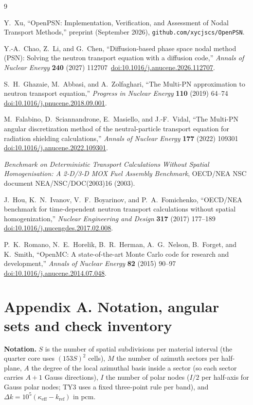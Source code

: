 \documentclass[11pt,a4paper]{article}
\newcommand{\keff}{\kappa_{\mathrm{eff}}}
\newcommand{\doi}[1]{\,\href{https://doi.org/#1}{doi:#1}}
\begin{document}
\begin{thebibliography}{9}
\small

Y.~Xu, ``OpenPSN: Implementation, Verification, and Assessment of Nodal Transport
Methods,'' preprint (September 2026), \texttt{github.com/xycjscs/OpenPSN}.

Y.-A.~Chao, Z.~Li, and G.~Chen, ``Diffusion-based phase space nodal method (PSN):
Solving the neutron transport equation with a diffusion code,'' \emph{Annals of
Nuclear Energy} \textbf{240} (2027) 112707 \doi{10.1016/j.anucene.2026.112707}.

S.~H.~Ghazaie, M.~Abbasi, and A.~Zolfaghari, ``The Multi-PN approximation to neutron
transport equation,'' \emph{Progress in Nuclear Energy} \textbf{110} (2019) 64--74
\doi{10.1016/j.pnucene.2018.09.001}.

M.~Falabino, D.~Sciannandrone, E.~Masiello, and J.-F.~Vidal, ``The Multi-PN angular
discretization method of the neutral-particle transport equation for radiation
shielding calculations,'' \emph{Annals of Nuclear Energy} \textbf{177} (2022) 109301
\doi{10.1016/j.anucene.2022.109301}.

\emph{Benchmark on Deterministic Transport Calculations Without Spatial
Homogenisation: A 2-D/3-D MOX Fuel Assembly Benchmark}, OECD/NEA NSC document
NEA/NSC/DOC(2003)16 (2003).

J.~Hou, K.~N.~Ivanov, V.~F.~Boyarinov, and P.~A.~Fomichenko, ``OECD/NEA benchmark for
time-dependent neutron transport calculations without spatial homogenization,''
\emph{Nuclear Engineering and Design} \textbf{317} (2017) 177--189
\doi{10.1016/j.nucengdes.2017.02.008}.

P.~K.~Romano, N.~E.~Horelik, B.~R.~Herman, A.~G.~Nelson, B.~Forget, and K.~Smith,
``OpenMC: A state-of-the-art Monte Carlo code for research and development,''
\emph{Annals of Nuclear Energy} \textbf{82} (2015) 90--97
\doi{10.1016/j.anucene.2014.07.048}.

\end{thebibliography}

\appendix
\section*{Appendix A. Notation, angular sets and check inventory}

\textbf{Notation.} $S$ is the number of spatial subdivisions per material interval
(the quarter core uses $(153S)^2$ cells), $M$ the number of azimuth sectors per
half-plane, $A$ the degree of the local azimuthal basis inside a sector (so each
sector carries $A{+}1$ Gauss directions), $I$ the number of polar nodes ($I/2$ per
half-axis for Gauss polar nodes; TY3 uses a fixed three-point rule per band), and
$\Delta k=10^{5}(\keff-k_\mathrm{ref})$ in pcm.
\end{document}

